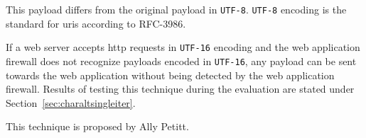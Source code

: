 This payload differs from the original payload in \verb|UTF-8|. \verb|UTF-8| encoding is the standard for \acrshort{uri}s according to RFC-3986. \cite{rfc3986}

If a web server accepts \acrshort{http} requests in \verb|UTF-16| encoding and the web application firewall does not recognize payloads encoded in \verb|UTF-16|, any payload can be sent towards the web application without being detected by the web application firewall. Results of testing this technique during the evaluation are stated under Section~\ref{sec:charaltsingleiter}.

This technique is proposed by Ally Petitt. \cite{medium/allypetitt}
